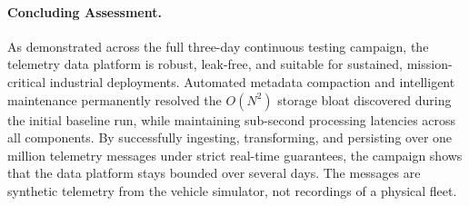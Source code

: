 \paragraph{Concluding Assessment.}
As demonstrated across the full three-day continuous testing campaign, the telemetry data platform is robust, leak-free, and suitable for sustained, mission-critical industrial deployments. Automated metadata compaction and intelligent maintenance permanently resolved the $O(N^2)$ storage bloat discovered during the initial baseline run, while maintaining sub-second processing latencies across all components. By successfully ingesting, transforming, and persisting over one million telemetry messages under strict real-time guarantees, the campaign shows that the data platform stays bounded over several days. The messages are synthetic telemetry from the vehicle simulator, not recordings of a physical fleet.
